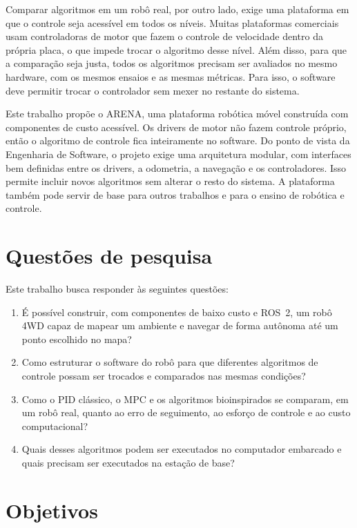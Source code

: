 Comparar algoritmos em um robô real, por outro lado, exige uma plataforma
em que o controle seja acessível em todos os níveis. Muitas plataformas
comerciais usam controladoras de motor que fazem o controle de velocidade
dentro da própria placa, o que impede trocar o algoritmo desse nível.
Além disso, para que a comparação seja justa, todos os algoritmos
precisam ser avaliados no mesmo hardware, com os mesmos ensaios e as
mesmas métricas. Para isso, o software deve permitir trocar o controlador
sem mexer no restante do sistema.

Este trabalho propõe o ARENA, uma plataforma robótica móvel construída com
componentes de custo acessível. Os drivers de motor não fazem controle
próprio, então o algoritmo de controle fica inteiramente no software. Do
ponto de vista da Engenharia de Software, o projeto exige uma arquitetura
modular, com interfaces bem definidas entre os drivers, a odometria, a
navegação e os controladores. Isso permite incluir novos algoritmos sem
alterar o resto do sistema. A plataforma também pode servir de base para
outros trabalhos e para o ensino de robótica e controle.

\section{Questões de pesquisa}

Este trabalho busca responder às seguintes questões:

\begin{enumerate}
	\item É possível construir, com componentes de baixo custo e ROS~2, um
	robô 4WD capaz de mapear um ambiente e navegar de forma autônoma até
	um ponto escolhido no mapa?
	\item Como estruturar o software do robô para que diferentes
	algoritmos de controle possam ser trocados e comparados nas mesmas
	condições?
	\item Como o PID clássico, o MPC e os algoritmos bioinspirados se
	comparam, em um robô real, quanto ao erro de seguimento, ao esforço de
	controle e ao custo computacional?
	\item Quais desses algoritmos podem ser executados no computador
	embarcado e quais precisam ser executados na estação de base?
\end{enumerate}

\section{Objetivos}

